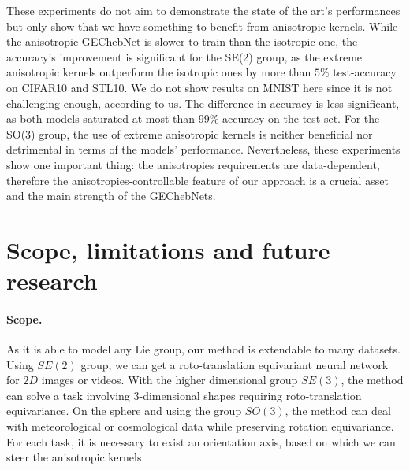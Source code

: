 \documentclass{article}
\newcommand{\haguettaz}[1]{{\color[rgb]{.8,.3,.2}{#1}}}
\begin{document}
These experiments do not aim to demonstrate the state of the art's performances but only show that we have something to benefit from anisotropic kernels. While the anisotropic GEChebNet is slower to train than the isotropic one, the accuracy's improvement is significant for the SE(2) group, as the extreme anisotropic kernels outperform the isotropic ones by more than $5\%$ test-accuracy on CIFAR10 and STL10. We do not show results on MNIST here since it is not challenging enough, according to us. The difference in accuracy is less significant, as both models saturated at most than $99\%$ accuracy on the test set. For the SO(3) group, the use of extreme anisotropic kernels is neither beneficial nor detrimental in terms of the models' performance. Nevertheless, these experiments show one important thing: the anisotropies requirements are data-dependent, therefore the anisotropies-controllable feature of our approach is a crucial asset and the main strength of the GEChebNets.

\haguettaz{comment so3 performance + add something about mAP and per class accuracy}

\section{Scope, limitations and future research} \label{sec:scope_limitations_future_research}

\paragraph{Scope.} As it is able to model any Lie group, our method is extendable to many datasets. Using $SE(2)$ group, we can get a roto-translation equivariant neural network for $2D$ images or videos. With the higher dimensional group $SE(3)$, the method can solve a task involving 3-dimensional shapes requiring roto-translation equivariance. On the sphere and using the group $SO(3)$, the method can deal with meteorological or cosmological data while preserving rotation equivariance. For each task, it is necessary to exist an orientation axis, based on which we can steer the anisotropic kernels.
\end{document}
